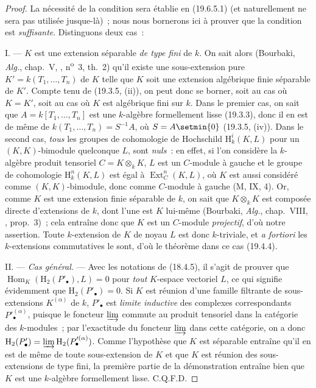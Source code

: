 \begin{proof}
La nécessité de la condition sera établie en (19.6.5.1) (et naturellement ne
sera pas utilisée jusque-là)~; nous nous bornerons ici à prouver que la
condition est \emph{suffisante}. Distinguons deux cas~:

I. --- $K$ est une extension séparable \emph{de type fini} de $k$. On sait
alors (Bourbaki, \emph{Alg.}, chap.~V, ,
n\textsuperscript{o}~3, th.~2) qu'il existe une sous-extension pure
$K'=k(T_1,\ldots,T_n)$ de $K$ telle que $K$ soit une extension algébrique
finie séparable de $K'$. Compte tenu de (19.3.5, (ii)), on peut donc se
borner, soit au cas où $K=K'$, soit au cas où $K$ est algébrique fini sur $k$.
Dans le premier cas, on sait que $A=k[T_1,\ldots,T_n]$ est une $k$-algèbre
formellement lisse (19.3.3), donc il en est de même de
$k(T_1,\ldots,T_n)=S^{-1}A$, où $S=A\setmin\{0\}$ (19.3.5, (iv)). Dans le second
cas, \emph{tous} les groupes de cohomologie de Hochschild
$\mathrm H_k^i(K,L)$ pour un $(K,K)$-bimodule quelconque $L$, sont \emph{nuls}~: en
effet, si l'on considère la $k$-algèbre produit tensoriel $C=K\otimes_k K$,
$L$ est un $C$-module à gauche et le groupe de cohomologie
$\mathrm H_k^n(K,L)$ est égal à $\operatorname{Ext}_C^n(K,L)$, où $K$ est
aussi considéré comme $(K,K)$-bimodule,
donc comme $C$-module à gauche (M, IX, 4). Or, comme $K$ est une extension
finie séparable de $k$, on sait que $K\otimes_k K$ est composée directe
d'extensions de $k$, dont l'une est $K$ lui-même (Bourbaki, \emph{Alg.},
chap.~VIII, , prop.~3)~; cela entraîne donc que $K$ est un
$C$-module \emph{projectif}, d'où notre assertion. Toute $k$-extension de $K$
de noyau $L$ est donc $k$-triviale, et \emph{a fortiori} les $k$-extensions
commutatives le sont, d'où le théorème dans ce cas (19.4.4).

II. --- \emph{Cas général.} --- Avec les notations de (18.4.5), il s'agit de
prouver que $\operatorname{Hom}_K(\mathrm H_2(P'_\bullet),L)=0$ pour
\emph{tout} $K$-espace vectoriel $L$, ce qui signifie évidemment que
$\mathrm H_2(P'_\bullet)=0$. Si $K$ est réunion d'une famille filtrante de
sous-extensions $K^{(\alpha)}$ de $k$, $P'_\bullet$ est \emph{limite
inductive} des complexes correspondants $P'^{(\alpha)}_\bullet$, puisque le
foncteur $\varinjlim$ commute au produit tensoriel dans la catégorie des
$k$-modules~; par l'exactitude du foncteur $\varinjlim$ dans cette catégorie,
on a donc
$\mathrm H_2(P'_\bullet)=\varinjlim\mathrm H_2(P'^{(\alpha)}_\bullet)$.
Comme l'hypothèse que $K$ est séparable entraîne qu'il en est de même de toute
sous-extension de $K$ et que $K$ est réunion des sous-extensions de type fini,
la première partie de la démonstration entraîne bien que $K$ est une
$k$-algèbre formellement lisse. C.Q.F.D.
\end{proof}

